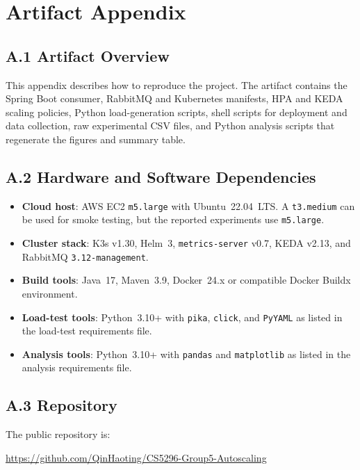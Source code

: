 \appendix
\section*{Artifact Appendix}

\subsection*{A.1 Artifact Overview}
This appendix describes how to reproduce the project. The artifact contains the Spring Boot consumer, RabbitMQ and Kubernetes manifests, HPA and KEDA scaling policies, Python load-generation scripts, shell scripts for deployment and data collection, raw experimental CSV files, and Python analysis scripts that regenerate the figures and summary table.

\subsection*{A.2 Hardware and Software Dependencies}
\begin{itemize}
  \item \textbf{Cloud host}: AWS EC2 \texttt{m5.large} with Ubuntu~22.04~LTS. A \texttt{t3.medium} can be used for smoke testing, but the reported experiments use \texttt{m5.large}.
  \item \textbf{Cluster stack}: K3s v1.30, Helm~3, \texttt{metrics-server} v0.7, KEDA v2.13, and RabbitMQ \texttt{3.12-management}.
  \item \textbf{Build tools}: Java~17, Maven~3.9, Docker~24.x or compatible Docker Buildx environment.
  \item \textbf{Load-test tools}: Python~3.10+ with \texttt{pika}, \texttt{click}, and \texttt{PyYAML} as listed in the load-test requirements file.
  \item \textbf{Analysis tools}: Python~3.10+ with \texttt{pandas} and \texttt{matplotlib} as listed in the analysis requirements file.
\end{itemize}

\subsection*{A.3 Repository}
The public repository is:
\begin{center}
\url{https://github.com/QinHaoting/CS5296-Group5-Autoscaling}
\end{center}

